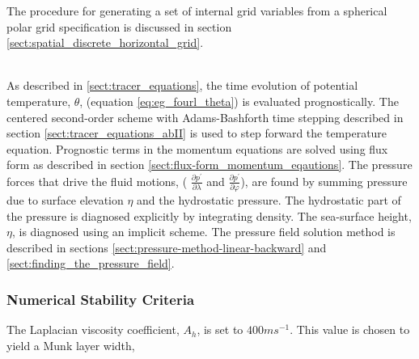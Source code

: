 The procedure for generating a set of internal grid variables from a
spherical polar grid specification is discussed in section 
\ref{sect:spatial_discrete_horizontal_grid}.

\noindent{}\\



As described in \ref{sect:tracer_equations}, the time evolution of potential 
temperature, 
$\theta$, (equation \ref{eq:eg_fourl_theta})
is evaluated prognostically. The centered second-order scheme with
Adams-Bashforth time stepping described in section 
\ref{sect:tracer_equations_abII} is used to step forward the temperature 
equation. Prognostic terms in
the momentum equations are solved using flux form as
described in section \ref{sect:flux-form_momentum_eqautions}.
The pressure forces that drive the fluid motions, (
$\frac{\partial p^{'}}{\partial \lambda}$ and $\frac{\partial p^{'}}{\partial \varphi}$), are found by summing pressure due to surface 
elevation $\eta$ and the hydrostatic pressure. The hydrostatic part of the 
pressure is diagnosed explicitly by integrating density. The sea-surface
height, $\eta$, is diagnosed using an implicit scheme. The pressure
field solution method is described in sections
\ref{sect:pressure-method-linear-backward} and 
\ref{sect:finding_the_pressure_field}.

\subsubsection{Numerical Stability Criteria}
\label{www:tutorials}

The Laplacian viscosity coefficient, $A_{h}$, is set to $400 m s^{-1}$.
This value is chosen to yield a Munk layer width,

